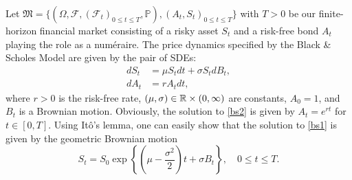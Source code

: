 Let $\mathfrak{M}=\{(\Omega,\mathcal{F},(\mathcal{F}_{t})_{0\leq t\leq T},\mathbb{P}), (A_{t},S_{t})_{0\leq t\leq T}\}$ with $T>0$ be our finite-horizon financial market consisting of a risky asset $S_{t}$ and a risk-free bond $A_{t}$ playing the role as a numéraire. The price dynamics specified by the Black \& Scholes Model are given by the pair of SDEs:
\begin{align}
    dS_{t}&=\mu S_{t}dt+\sigma S_{t}dB_{t},\label{bs1} \\ 
    dA_{t}&=rA_{t}dt, \label{bs2}
\end{align}
where $r>0$ is the risk-free rate, $(\mu,\sigma)\in\mathbb{R}\times (0,\infty)$ are constants, $A_{0}=1$, and $B_t$ is a Brownian motion. Obviously, the solution to \eqref{bs2} is given by $A_{t}=e^{rt}$ for $t\in [0,T]$. Using Itô's lemma, one can easily show that the solution to \eqref{bs1} is given by the geometric Brownian motion
\begin{equation}
    S_{t}=S_{0}\exp\left\{\left(\mu-\frac{\sigma^2}{2}\right)t+\sigma B_{t}\right\}, \quad 0\leq t\leq T.
\end{equation}


